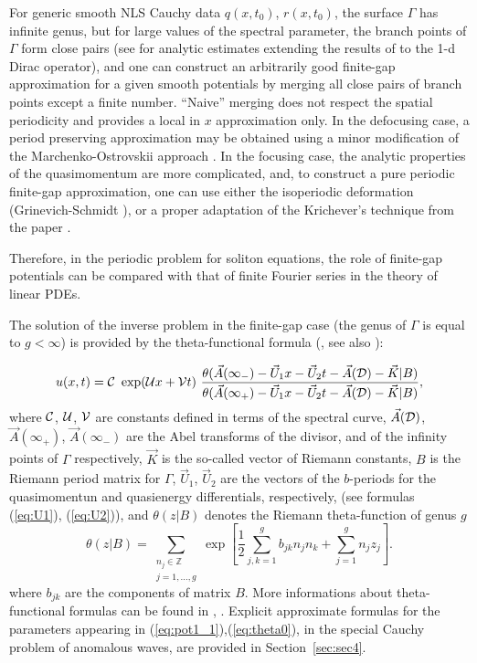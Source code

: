\documentclass[12pt]{article}
\newcommand{\ZZ}{{\mathbb Z}}
\newcommand{\DD}{{\cal D}}
\begin{document}
For generic smooth NLS Cauchy data $q(x,t_0)$, $r(x,t_0)$, the surface $\Gamma$ has infinite genus, but for large values of the spectral parameter, the branch points of $\Gamma$ form close pairs (see \cite{DjMit} for analytic estimates extending the results of \cite{Hochstadt} to the 1-d Dirac operator), and one can construct an arbitrarily good finite-gap approximation for a given smooth potentials by merging all close pairs of branch points except a finite number. ``Naive'' merging does not respect the spatial periodicity and provides a local in $x$ approximation only. In the defocusing case, a period preserving approximation may be obtained using a minor modification of the Marchenko-Ostrovskii approach \cite{MO}. In the focusing case, the analytic properties of the quasimomentum are more complicated, and, to construct a pure periodic finite-gap approximation, one can use either the isoperiodic deformation (Grinevich-Schmidt \cite{GrSch}), or a proper adaptation of the Krichever's technique from the paper \cite{Krichever2}.

Therefore, in the periodic problem for soliton equations, the role of finite-gap potentials can be compared with that of finite Fourier series in the theory of linear PDEs. 

The solution of the inverse problem in the finite-gap case (the genus of $\Gamma$ is equal to $g<\infty$) is provided by the theta-functional formula (\cite{ItsKotlj}, see also \cite{Prev}):
 
\begin{equation}
\label{eq:pot1_1}
u(x,t)={\cal C} \ \exp({\cal U}x + {\cal V} t) \ \frac{\theta( \vec A(\infty_{-}) -\vec U_1 x - \vec U_2 t -\vec A(\DD) -\vec K |B)}{\theta(\vec A(\infty_+) -\vec U_1 x - \vec U_2 t -\vec A(\DD) -\vec K |B)},
\end{equation}
where $\cal C$, $\cal U$, $\cal V$ are constants defined in terms of the spectral curve,  $\vec A(\DD)$, $\vec A(\infty_{+})$,  $\vec A(\infty_{-})$ are the Abel transforms of the divisor, and of the infinity points of $\Gamma$ respectively, $\vec K$ is the so-called vector of Riemann constants, $B$ is the Riemann period matrix for $\Gamma$, $\vec U_1$, $\vec U_2$ are the vectors of the $b$-periods for the quasimomentun and quasienergy differentials, respectively, (see formulas (\ref{eq:U1}),  (\ref{eq:U2})), and $\theta(z|B)$ denotes the Riemann theta-function of genus $g$ 
\begin{equation}
\label{eq:theta0}
\theta(z|B)=\sum\limits_{\begin{array}{cc}n_j\in\ZZ \\ j=1,\ldots,g\end{array}}
\exp{\left[ \frac{1}{2} \sum_{j,k=1}^g b_{jk}n_j n_k +  \sum_{j=1}^g n_j z_j  \right] }.
\end{equation}
where $b_{jk}$ are the components of matrix $B$. More informations about theta-functional formulas can be found in \cite{Dubrovin2}, \cite{BBEIM}. Explicit approximate formulas for the parameters appearing in (\ref{eq:pot1_1}),(\ref{eq:theta0}), in the special Cauchy problem of anomalous waves, are provided in Section~\ref{sec:sec4}.
\end{document}
